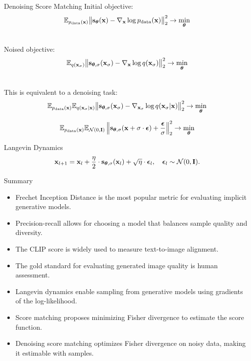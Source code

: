 \documentclass{beamer}
\renewcommand{\eqpause}{}
\begin{document}
\begin{frame}{Denoising Score Matching}
	Initial objective:
	\vspace{-0.2cm}
	\[
		\mathbb{E}_{p_{\text{data}}(\mathbf{x})}\big\| \mathbf{s}_{\boldsymbol{\theta}}(\mathbf{x}) - \nabla_{\mathbf{x}} \log p_{\text{data}}(\mathbf{x}) \big\|^2_2 \rightarrow \min_{\boldsymbol{\theta}}
	\]
	\eqpause
	\vspace{-0.5cm} \\
	Noised objective:
	\vspace{-0.2cm}
	\[
		\mathbb{E}_{q(\mathbf{x}_{\sigma})}\big\| \mathbf{s}_{\boldsymbol{\theta}, \sigma}(\mathbf{x}_\sigma) - \nabla_{\mathbf{x}} \log q(\mathbf{x}_{\sigma}) \big\|^2_2 \rightarrow \min_{\boldsymbol{\theta}}
	\]
	\eqpause
	\vspace{-0.5cm} \\
	This is equivalent to a denoising task:
	\vspace{-0.2cm}
	\[
		\mathbb{E}_{p_{\text{data}}(\mathbf{x})} \mathbb{E}_{q(\mathbf{x}_{\sigma} | \mathbf{x})}\big\| \mathbf{s}_{\boldsymbol{\theta}, \sigma}(\mathbf{x}_{\sigma}) - \nabla_{\mathbf{x}_{\sigma}} \log q(\mathbf{x}_{\sigma} | \mathbf{x}) \big\|^2_2 \rightarrow \min_{\boldsymbol{\theta}}
	\]
	\eqpause
	\vspace{-0.3cm}
	\[
		\mathbb{E}_{p_{\text{data}}(\mathbf{x})} \mathbb{E}_{\mathcal{N}(0, \mathbf{I})}\left\| \mathbf{s}_{\boldsymbol{\theta}, \sigma}(\mathbf{x} + \sigma \cdot \boldsymbol{\epsilon}) + \frac{\boldsymbol{\epsilon}}{\sigma} \right\|^2_2 \rightarrow \min_{\boldsymbol{\theta}}
	\]
	\vspace{-0.5cm}
	\begin{block}{Langevin Dynamics}
		\vspace{-0.3cm}
		\[
			\mathbf{x}_{l + 1} = \mathbf{x}_l + \frac{\eta}{2} \cdot \mathbf{s}_{\boldsymbol{\theta}, \sigma}(\mathbf{x}_l) + \sqrt{\eta} \cdot \boldsymbol{\epsilon}_l, \quad \boldsymbol{\epsilon}_l \sim \mathcal{N}(0, \mathbf{I}).
		\]
		\vspace{-0.7cm}
	\end{block}
\end{frame}
\begin{frame}{Summary}
	\begin{itemize}
		\item Frechet Inception Distance is the most popular metric for evaluating implicit generative models.
		\vfill
		\item Precision-recall allows for choosing a model that balances sample quality and diversity.
		\vfill
		\item The CLIP score is widely used to measure text-to-image alignment.
		\vfill
		\item The gold standard for evaluating generated image quality is human assessment.
		\vfill
		\item Langevin dynamics enable sampling from generative models using gradients of the log-likelihood.
		\vfill
		\item Score matching proposes minimizing Fisher divergence to estimate the score function.
		\vfill
		\item Denoising score matching optimizes Fisher divergence on noisy data, making it estimable with samples.
	\end{itemize}
\end{frame}
\end{document}
